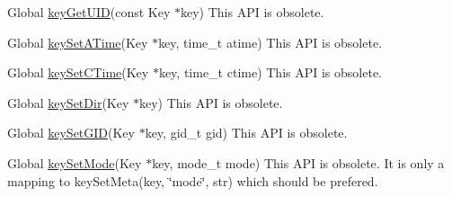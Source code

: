 \label{deprecated__deprecated000002}
\hypertarget{deprecated__deprecated000002}{}
 
\begin{DoxyDescription}
\item[Global \hyperlink{group__keymeta_gacaa5060e67b03f50ae49a3620c54bc46}{keyGetUID}(const Key $\ast$key) ]This API is obsolete.
\end{DoxyDescription}

\label{deprecated__deprecated000010}
\hypertarget{deprecated__deprecated000010}{}
 
\begin{DoxyDescription}
\item[Global \hyperlink{group__keymeta_ga995d8b84731673c88c7c01f3fed538b9}{keySetATime}(Key $\ast$key, time\_\-t atime) ]This API is obsolete.
\end{DoxyDescription}

\label{deprecated__deprecated000014}
\hypertarget{deprecated__deprecated000014}{}
 
\begin{DoxyDescription}
\item[Global \hyperlink{group__keymeta_ga9f502ecab8ab43f0b17220fcc95f3fa5}{keySetCTime}(Key $\ast$key, time\_\-t ctime) ]This API is obsolete.
\end{DoxyDescription}

\label{deprecated__deprecated000006}
\hypertarget{deprecated__deprecated000006}{}
 
\begin{DoxyDescription}
\item[Global \hyperlink{group__keymeta_gaae575bd86a628a15ee45baa860522e75}{keySetDir}(Key $\ast$key) ]This API is obsolete.
\end{DoxyDescription}

\label{deprecated__deprecated000005}
\hypertarget{deprecated__deprecated000005}{}
 
\begin{DoxyDescription}
\item[Global \hyperlink{group__keymeta_ga9e3d0fb3f7ba906e067727b9155d22e3}{keySetGID}(Key $\ast$key, gid\_\-t gid) ]This API is obsolete.
\end{DoxyDescription}

\label{deprecated__deprecated000008}
\hypertarget{deprecated__deprecated000008}{}
 
\begin{DoxyDescription}
\item[Global \hyperlink{group__keymeta_ga8803037e35b9da1ce492323a88ff6bc3}{keySetMode}(Key $\ast$key, mode\_\-t mode) ]This API is obsolete. It is only a mapping to keySetMeta(key, \char`\"{}mode\char`\"{}, str) which should be prefered.
\end{DoxyDescription}

